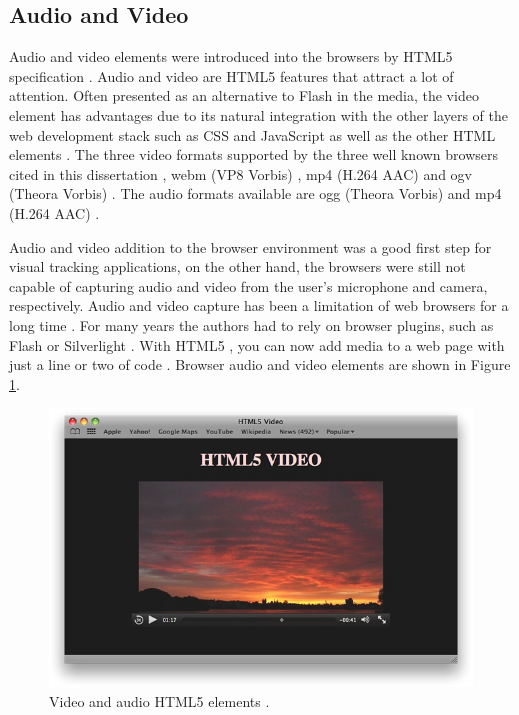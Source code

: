 
\subsection{Audio and Video} %
\label{sub:basic_concepts:web:audio_and_video}

Audio and video elements were introduced into the browsers by HTML5 specification \cite{Hickson2013}. Audio and video are HTML5 \cite{Hickson2013} features that attract a lot of attention. Often presented as an alternative to Flash \cite{Flash2013} in the media, the video element has advantages due to its natural integration with the other layers of the web development stack such as CSS \cite{CSS2013} and JavaScript \cite{International2009} as well as the other HTML elements \cite{WC2006}. The three video formats supported by the three well known browsers cited in this dissertation \cite{WC2006,Rocks2013}, webm (VP8 Vorbis) \cite{Vorbis2012}, mp4 (H.264 AAC) \cite{AAC2006} and ogv (Theora Vorbis) \cite{Theora2011}. The audio formats available are ogg (Theora Vorbis) \cite{Theora2011} and mp4 (H.264 AAC) \cite{AAC2006}.

Audio and video addition to the browser environment was a good first step for visual tracking applications, on the other hand, the browsers were still not capable of capturing audio and video from the user's microphone and camera, respectively. Audio and video capture has been a limitation of web browsers for a long time \cite{Hickson2013}. For many years the authors had to rely on browser plugins, such as Flash \cite{Flash2013} or Silverlight \cite{Silverlight2013,Rocks2013}. With HTML5 \cite{Hickson2013}, you can now add media to a web page with just a line or two of code \cite{WebKit2013}. Browser audio and video elements \cite{Hickson2013} are shown in Figure \ref{figure:html5_audio_video}.

\begin{figure}[!htb]
  \centering
  \includegraphics[width=380pt]{chapters/basic_concepts/html5_audio_video.png}
  \caption{Video and audio HTML5 elements \cite{WebKit2013}.}
  \label{figure:html5_audio_video}
\end{figure}

